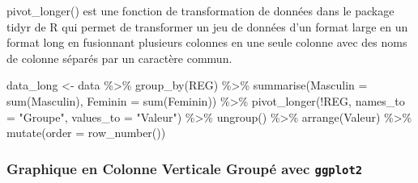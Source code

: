 \documentclass[
]{article}
\newenvironment{Shaded}{\begin{snugshade}}{\end{snugshade}}
\newcommand{\AttributeTok}[1]{\textcolor[rgb]{0.77,0.63,0.00}{#1}}
\newcommand{\FunctionTok}[1]{\textcolor[rgb]{0.00,0.00,0.00}{#1}}
\newcommand{\NormalTok}[1]{#1}
\newcommand{\OtherTok}[1]{\textcolor[rgb]{0.56,0.35,0.01}{#1}}
\newcommand{\SpecialCharTok}[1]{\textcolor[rgb]{0.00,0.00,0.00}{#1}}
\newcommand{\StringTok}[1]{\textcolor[rgb]{0.31,0.60,0.02}{#1}}
\begin{document}
pivot\_longer() est une fonction de transformation de données dans le
package tidyr de R qui permet de transformer un jeu de données d'un
format large en un format long en fusionnant plusieurs colonnes en une
seule colonne avec des noms de colonne séparés par un caractère commun.

\begin{Shaded}
\begin{Highlighting}[]
\NormalTok{data\_long }\OtherTok{\textless{}{-}}\NormalTok{ data }\SpecialCharTok{\%\textgreater{}\%} 
  \FunctionTok{group\_by}\NormalTok{(REG) }\SpecialCharTok{\%\textgreater{}\%} 
  \FunctionTok{summarise}\NormalTok{(}\AttributeTok{Masculin =} \FunctionTok{sum}\NormalTok{(Masculin), }\AttributeTok{Feminin =} \FunctionTok{sum}\NormalTok{(Feminin)) }\SpecialCharTok{\%\textgreater{}\%}
  \FunctionTok{pivot\_longer}\NormalTok{(}\SpecialCharTok{!}\NormalTok{REG, }\AttributeTok{names\_to =} \StringTok{"Groupe"}\NormalTok{, }\AttributeTok{values\_to =} \StringTok{"Valeur"}\NormalTok{) }\SpecialCharTok{\%\textgreater{}\%}
  \FunctionTok{ungroup}\NormalTok{() }\SpecialCharTok{\%\textgreater{}\%}
  \FunctionTok{arrange}\NormalTok{(Valeur) }\SpecialCharTok{\%\textgreater{}\%} 
  \FunctionTok{mutate}\NormalTok{(}\AttributeTok{order =} \FunctionTok{row\_number}\NormalTok{())}
\end{Highlighting}
\end{Shaded}

\hypertarget{graphique-en-colonne-verticale-groupuxe9-avec-ggplot2}{%
\subsubsection{\texorpdfstring{Graphique en Colonne Verticale Groupé
avec
\texttt{ggplot2}}{Graphique en Colonne Verticale Groupé avec ggplot2}}\label{graphique-en-colonne-verticale-groupuxe9-avec-ggplot2}}
\end{document}
